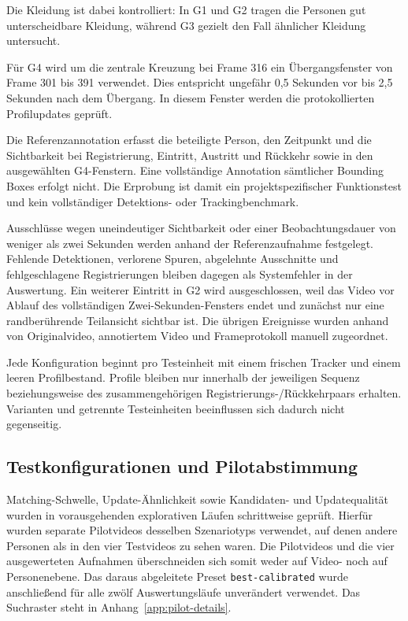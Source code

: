 \documentclass[runningheads,a4paper]{llncs}
\begin{document}
Die Kleidung ist dabei kontrolliert: In G1 und G2 tragen die Personen gut unterscheidbare Kleidung, während G3 gezielt den Fall ähnlicher Kleidung untersucht.

Für G4 wird um die zentrale Kreuzung bei Frame 316 ein Übergangsfenster von Frame 301 bis 391 verwendet. Dies entspricht ungefähr 0,5 Sekunden vor bis 2,5 Sekunden nach dem Übergang. In diesem Fenster werden die protokollierten Profilupdates geprüft.

Die Referenzannotation erfasst die beteiligte Person, den Zeitpunkt und die Sichtbarkeit bei Registrierung, Eintritt, Austritt und Rückkehr sowie in den ausgewählten G4-Fenstern. Eine vollständige Annotation sämtlicher Bounding Boxes erfolgt nicht. Die Erprobung ist damit ein projektspezifischer Funktionstest und kein vollständiger Detektions- oder Trackingbenchmark.

Ausschlüsse wegen uneindeutiger Sichtbarkeit oder einer Beobachtungsdauer von weniger als zwei Sekunden werden anhand der Referenzaufnahme festgelegt. Fehlende Detektionen, verlorene Spuren, abgelehnte Ausschnitte und fehlgeschlagene Registrierungen bleiben dagegen als Systemfehler in der Auswertung. Ein weiterer Eintritt in G2 wird ausgeschlossen, weil das Video vor Ablauf des vollständigen Zwei-Sekunden-Fensters endet und zunächst nur eine randberührende Teilansicht sichtbar ist. Die übrigen Ereignisse wurden anhand von Originalvideo, annotiertem Video und Frameprotokoll manuell zugeordnet.

Jede Konfiguration beginnt pro Testeinheit mit einem frischen Tracker und einem leeren Profilbestand. Profile bleiben nur innerhalb der jeweiligen Sequenz beziehungsweise des zusammengehörigen Registrierungs-/Rückkehrpaars erhalten. Varianten und getrennte Testeinheiten beeinflussen sich dadurch nicht gegenseitig.

\subsection{Testkonfigurationen und Pilotabstimmung}
\label{sec:calibration}

Matching-Schwelle, Update-Ähnlichkeit sowie Kandidaten- und Updatequalität wurden in vorausgehenden explorativen Läufen schrittweise geprüft. Hierfür wurden separate Pilotvideos desselben Szenariotyps verwendet, auf denen andere Personen als in den vier Testvideos zu sehen waren. Die Pilotvideos und die vier ausgewerteten Aufnahmen überschneiden sich somit weder auf Video- noch auf Personenebene. Das daraus abgeleitete Preset \texttt{best-calibrated} wurde anschlie{\ss}end für alle zwölf Auswertungsläufe unverändert verwendet. Das Suchraster steht in Anhang~\ref{app:pilot-details}.
\end{document}
